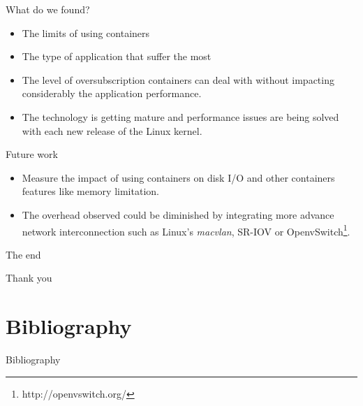 \documentclass[presentation]{beamer}
\begin{document}
\begin{frame}[label=sec-4-2]{What do we found?}
\begin{itemize}
\item The limits of using containers
\item The type of application that suffer the most
\item The level of oversubscription containers can deal with without impacting considerably the application performance.
\item The technology is getting mature and performance issues are being solved with each
new release of the Linux kernel.
\end{itemize}
\end{frame}


\begin{frame}[label=sec-4-3]{Future work}
\begin{itemize}
\item Measure the impact of using containers on disk I/O and other
containers features like memory limitation.

\item The overhead observed could be diminished by integrating
more advance network interconnection such as Linux's \emph{macvlan}, SR-IOV or OpenvSwitch\footnote{http://openvswitch.org/}.
\end{itemize}
\end{frame}

{
\begin{frame}[label=sec-4-4]{The end}

\vspace{3cm}
\par { {\center Thank you} }\par
\vspace{3cm}\hfill
\end{frame}
}



\section{Bibliography}
\label{sec-5}
\begin{frame}[label=sec-5-1]{Bibliography}



\appendix
\end{frame}
\end{document}
